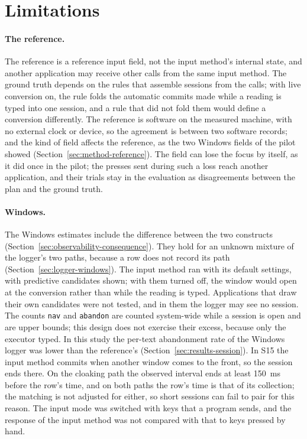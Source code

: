 
\section{Limitations}
\label{sec:limitations}

\paragraph{The reference.} The reference is a reference input field, not the input method's internal state, and
another application may receive other calls from the same input method. The ground truth depends on the rules that
assemble sessions from the calls; with live conversion on, the rule folds the automatic commits made while a reading is
typed into one session, and a rule that did not fold them would define a conversion differently. The reference is
software on the measured machine, with no external clock or device, so the agreement is between two software records;
and the kind of field affects the reference, as the two Windows fields of the pilot showed
(Section~\ref{sec:method-reference}).
The field can lose the focus by itself, as it did once in the pilot; the presses sent during such a loss reach another
application, and their trials stay in the evaluation as disagreements between the plan and the ground truth.

\paragraph{Windows.} The Windows estimates include the difference between the two constructs
(Section~\ref{sec:observability-consequence}). They hold for an unknown mixture of the
logger's two paths, because a row does not record its path (Section~\ref{sec:logger-windows}). The input method ran
with its default settings, with predictive candidates shown; with them turned off, the window would open at the
conversion rather than while the reading is typed. Applications that draw their own candidates were not tested, and in
them the logger may see no session. The counts \texttt{nav} and \texttt{abandon} are counted system-wide while a
session is open and are upper bounds; this design does not exercise their excess, because only the executor typed. In
this study the per-text abandonment rate of the Windows logger was lower than the reference's
(Section~\ref{sec:results-session}). In
S15 the input method commits when another window comes to the front, so the session ends there. On the cloaking path
the observed interval ends at least 150~ms before the row's time, and on both paths the row's time is that of its
collection; the matching is not adjusted for either, so short sessions can fail to pair for this reason. The input mode
was switched with keys that a program sends, and the response of the input method was not compared with that to keys
pressed by hand.

